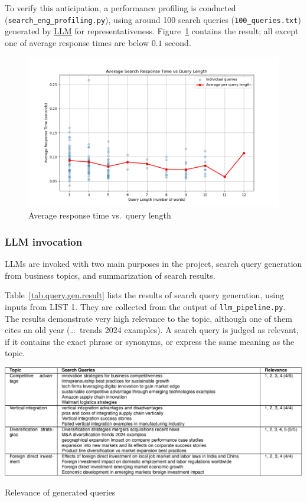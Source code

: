 \documentclass[final-report]{report-template}
\newcommand\ttb{\discretionary{}{}{}}
\begin{document}
To verify this anticipation, a performance profiling is conducted
(\texttt{search\_\ttb eng\_\ttb profiling.py}), using around 100
search queries (\texttt{100\_\ttb queries.txt}) generated by
\href{https://chatgpt.com/share/689a013a-5964-8011-af0d-68a169ce8290}{LLM} for
representativeness. Figure~\ref{fig.response.time} contains the result; all
except one of average response times are below $0.1$ second.
\begin{figure}[hbtp!]
	\centering
	\includegraphics[height=.25\textheight]{res/avg_time_vs_query_length.png}
	\caption{Average response time vs.\ query length}
	\label{fig.response.time}
\end{figure}

\subsubsection{LLM invocation}
LLMs are invoked with two main purposes in the project, search query generation
from business topics, and summarization of search results.

Table~\ref{tab.query.gen.result} lists the results of search query generation,
using inputs from LIST 1. They are collected from the output of
\texttt{llm\_\ttb pipeline.py}. The results demonstrate very high relevance to
the topic, although one of them cites an old year (\dots\ trends 2024
examples). A search query is judged as relevant, if it contains the exact
phrase or synonyms, or express the same meaning as the topic.
\begin{table}[hbtp!]
\centering
\includegraphics[width=.85\textwidth]{res/table_search_queries.png}
\caption{Relevance of generated queries}
\label{tab.query.gen.result}
\end{table}
\end{document}
